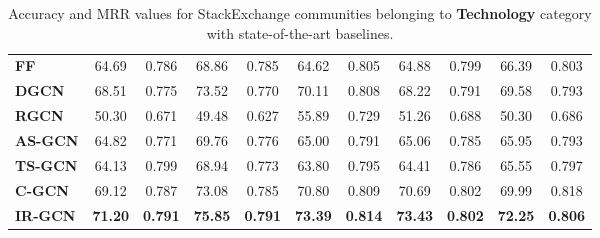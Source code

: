 \documentclass[smallcondensed]{svjour3}     %
\begin{document}
\begin{table}[h]
\begin{subtable}{\textwidth}
\begin{tabular}{l|c c|c c|c c|c c|c c}
      \textbf{FF~\cite{JendersKN16}} & 64.69 & 0.786 & 68.86 & 0.785 & 64.62 & 0.805 & 64.88 & 0.799 & 66.39 & 0.803\\
      \textbf{DGCN~\cite{DualGCN}} & 68.51 & 0.775 & 73.52 & 0.770 & 70.11 & 0.808 & 68.22 & 0.791 & 69.58 & 0.793 \\
      \textbf{RGCN~\cite{relationalGCN}} & 50.30 & 0.671 & 49.48 & 0.627 & 55.89 & 0.729 & 51.26 & 0.688 & 50.30 & 0.686\\
      \cmidrule(lr){1-1}\cmidrule(lr){2-11}%
      \textbf{AS-GCN} & 64.82 & 0.771 & 69.76 & 0.776 & 65.00 & 0.791 & 65.06 & 0.785 & 65.95 & 0.793 \\
      \textbf{TS-GCN} & 64.13 & 0.799 & 68.94 & 0.773 & 63.80 & 0.795 & 64.41 & 0.786 & 65.55 & 0.797\\
      \textbf{C-GCN } & 69.12 & 0.787 & 73.08 & 0.785 & 70.80 & 0.809 & 70.69 & 0.802 & 69.99 & 0.818\\
      \textbf{IR-GCN} & \textbf{71.20} & \textbf{0.791} & \bfseries 75.85 & \bfseries 0.791 & \bfseries 73.39 & \bfseries 0.814 & \textbf{73.43} & \textbf{0.802} & \textbf{72.25} & \textbf{0.806} \\
      \bottomrule
    \end{tabular}
    \end{subtable}
  \caption{\label{tab:stackacc} Accuracy and MRR values for StackExchange communities belonging to \textbf{Technology} category with state-of-the-art baselines.}
\end{table}
\end{document}
